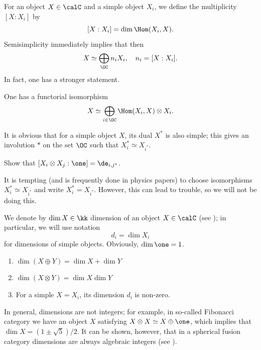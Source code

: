 For an object $X\in \calC$ and a simple object $X_i$, we define the multiplicity
$[X:X_i]$ by
$$
  [X:X_i]=\dim \Hom(X_i, X).
$$
Semisimplicity immediately implies
that then
$$
  X\simeq \bigoplus_{\OC} n_i X_i, \quad n_i = [X:X_i].
$$
In fact, one has a stronger statement.
\begin{lemma}\label{l:simple}
  One has a functorial isomorphism
  $$
    X\simeq \bigoplus_{i\in\OC} \Hom(X_i, X)\otimes X_i.
  $$
\end{lemma}

It is
obvious that for a simple object $X$, its dual $X^*$ is also simple; this gives
an involution $*$ on the set $\OC$ such that $X_i^*\simeq X_{i^*}$.

\begin{exercise}\label{ec:duality-spherical}
  Show that $[X_i\otimes X_j:\one]=\de_{i, j^*}$.
\end{exercise}

\begin{remark}
  It is tempting (and is frequently done in physics papers) to choose
  isomorphisms $X_{i}^*\simeq X_{i^*}$ and write $X_i^*=X_{i^*}$. However, this
  can lead to trouble, so we will not be doing this.
\end{remark}


We denote by $\dim X\in \kk$ dimension of an object $X\in \calC$ (see
); in particular, we will use notation
$$
d_i=\dim X_i
$$
for dimensions of simple objects. Obviously, $\dim \one =1$.

\begin{lemma}\label{l:dim-properties} \par\noindent
  \begin{enumerate}
    \item $\dim (X\oplus Y)= \dim X +\dim Y$
    \item $\dim (X\otimes Y)= \dim X \dim Y$
    \item For a simple $X=X_i$, its dimension $d_i$ is non-zero.
  \end{enumerate}
\end{lemma}

\begin{remark}
  In general, dimensions are not integers; for example, in so-called Fibonacci
  category we have an object $X$ satisfying $X\otimes X\simeq X\oplus \one$,
  which implies that $\dim X= (1\pm \sqrt{5})/2$. It can be shown, however, that
  in a spherical fusion category dimensions are always algebraic integers (see
  \cite[Corollary 4.7.13]{etingof-fusion}).
\end{remark}

